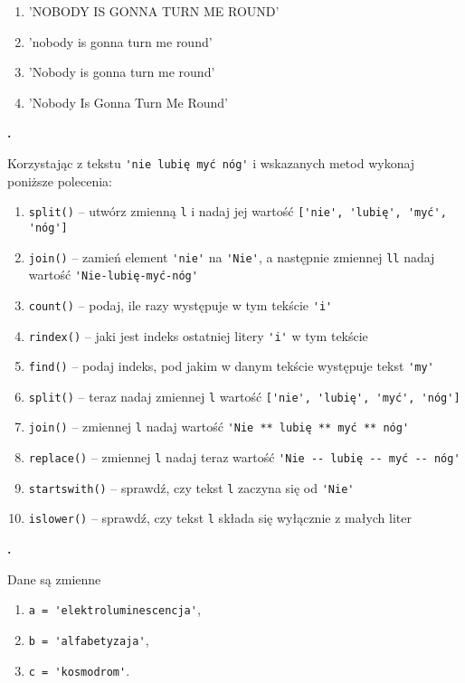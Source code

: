 \documentclass[a4paper]{article}
\begin{document}
\begin{enumerate}[label=\arabic*.]
    \item 'NOBODY IS GONNA TURN ME ROUND'
    \item 'nobody is gonna turn me round'
    \item 'Nobody is gonna turn me round'
    \item 'Nobody Is Gonna Turn Me Round'
\end{enumerate}

\textbf{.}\addtocounter{zadanie}{1} Korzystając z tekstu \verb|'nie lubię myć nóg'| i wskazanych metod wykonaj poniższe polecenia:

\begin{enumerate}[label=\arabic*.]
    \item \verb|split()| -- utwórz zmienną \verb|l| i nadaj jej wartość \verb|['nie', 'lubię', 'myć', 'nóg']|
    \item \verb|join()| -- zamień element \verb|'nie'| na \verb|'Nie'|, a następnie zmiennej \verb|ll| nadaj wartość \verb|'Nie-lubię-myć-nóg'|
    \item \verb|count()| -- podaj, ile razy występuje w tym tekście \verb|'i'|
    \item \verb|rindex()| -- jaki jest indeks ostatniej litery \verb|'i'| w tym tekście
    \item \verb|find()| -- podaj indeks, pod jakim w danym tekście występuje tekst \verb|'my'|
    \item \verb|split()| -- teraz nadaj zmiennej \verb|l| wartość \verb|['nie', 'lubię', 'myć', 'nóg']|
    \item \verb|join()| -- zmiennej \verb|l| nadaj wartość \verb|'Nie ** lubię ** myć ** nóg'|
    \item \verb|replace()| -- zmiennej \verb|l| nadaj teraz wartość \verb|'Nie -- lubię -- myć -- nóg'|
    \item \verb|startswith()| -- sprawdź, czy tekst \verb|l| zaczyna się od \verb|'Nie'|
    \item \verb|islower()| -- sprawdź, czy tekst \verb|l| składa się wyłącznie z małych liter

\end{enumerate}


\textbf{.}\addtocounter{zadanie}{1} Dane są zmienne
\begin{enumerate}[]
    \item \verb|a = 'elektroluminescencja'|,
    \item \verb|b = 'alfabetyzaja'|,
    \item \verb|c = 'kosmodrom'|.
\end{enumerate}
\end{document}
